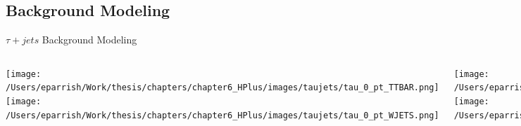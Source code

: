 \documentclass[aspectratio=169,xcolor=table]{beamer}
\begin{document}
  \subsection{ Background Modeling }
    \begin{frame}[t]{$\tau+jets$ Background Modeling}
        \begin{columns}[t]

        \texttt{[image: /Users/eparrish/Work/thesis/chapters/chapter6\_HPlus/images/taujets/tau\_0\_pt\_TTBAR.png]}
        \texttt{[image: /Users/eparrish/Work/thesis/chapters/chapter6\_HPlus/images/taujets/tau\_0\_pt\_WJETS.png]}

        \texttt{[image: /Users/eparrish/Work/thesis/chapters/chapter6\_HPlus/images/taujets/met\_et\_TTBAR.png]}
        \texttt{[image: /Users/eparrish/Work/thesis/chapters/chapter6\_HPlus/images/taujets/met\_et\_WJETS.png]}

        \texttt{[image: /Users/eparrish/Work/thesis/chapters/chapter6\_HPlus/images/taujets/tau\_0\_pt\_BVETO.png]}
        \texttt{[image: /Users/eparrish/Work/thesis/chapters/chapter6\_HPlus/images/taujets/tau\_0\_pt\_BVETO\_MT100.png]}


        \texttt{[image: /Users/eparrish/Work/thesis/chapters/chapter6\_HPlus/images/taujets/met\_et\_BVETO.png]}
        \texttt{[image: /Users/eparrish/Work/thesis/chapters/chapter6\_HPlus/images/taujets/tau\_0\_met\_mt\_BVETO\_MT100.png]}

      \end{columns}
    \end{frame}
\end{document}
